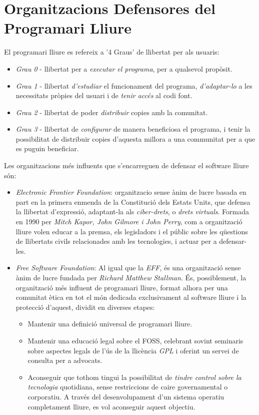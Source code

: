\section{Organitzacions Defensores del Programari Lliure}

El programari lliure es refereix a '4 Graus' de llibertat per als usuaris:

	\begin{itemize}
		\item \emph{Grau 0} - llibertat per a \emph{executar el programa}, per a qualsevol propòsit.
		\item \emph{Grau 1} - llibertat \emph{d'estudiar} el funcionament del programa, \emph{d'adaptar-lo} a les necessitats pròpies del usuari i de \emph{tenir accés} al codi font.
		\item \emph{Grau 2} - llibertat de poder \emph{distribuir} copies amb la comunitat.
		\item \emph{Grau 3} - llibertat de \emph{configurar} de manera beneficiosa el programa, i tenir la 		possibilitat de	distribuir copies d'aquesta millora a una communitat per a que es puguin 			beneficiar.
	\end{itemize}

Les organitzacions més influents que s'encarreguen de defensar el software lliure són:
 
 \begin{itemize}
\item \emph{Electronic Frontier Foundation}:  organitzacio sense ànim de lucre basada en part en la primera enmenda de la Constitució dels Estats Units, que defensa la llibertat d'expressió, adaptant-la als \emph{ciber-drets}, o \emph{drets virtuals}. Formada en 1990 per \textit{Mitch Kapor, John Gilmore i John Perry}, com a organització lliure volen educar a la premsa, els legisladors i el públic sobre les qüestions de llibertats civils relacionades amb les tecnologies, i actuar per a defensar-les. \cite{OrgDefEFF}
 \cite{OrgDefEFFII}
\item \emph{Free Software Foundation}: Al igual que la \emph{EFF}, és una 		organització sense ànim de lucre fundada per \emph{Richard Matthew Stallman}. És, possiblement, la organització més 		influent de programari lliure, format alhora per una comunitat ètica en tot el món dedicada 		exclusivament al software lliure i la protecció d'aquest, dividit en diverses etapes:


	\begin{itemize}
	\item Mantenir una definició universal de programari lliure.
	\item Mantenir una educació legal sobre el FOSS, celebrant sovint seminaris sobre aspectes legals de l'ús de la 		llicència \emph{GPL} i oferint un servei de consulta per a advocats.
	\item Aconseguir que tothom tingui la possibilitat de \emph{tindre control sobre la tecnologia} 	quotidiana, sense restriccions de caire governamental o corporatiu. A través del desenvolupament d'un sistema operatiu completament lliure, es vol aconseguir aquest objectiu. \cite{ObjGNU} \cite{OrgDefFSF}
	\end{itemize}

\end{itemize}

